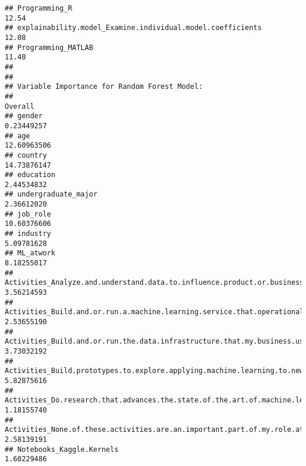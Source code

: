\documentclass[
]{article}
\begin{document}
\begin{verbatim}
## Programming_R                                                                                                                 12.54
## explainability.model_Examine.individual.model.coefficients                                                                    12.08
## Programming_MATLAB                                                                                                            11.40
## 
## 
## Variable Importance for Random Forest Model:
##                                                                                                                                 Overall
## gender                                                                                                                       0.23449257
## age                                                                                                                         12.60963506
## country                                                                                                                     14.73876147
## education                                                                                                                    2.44534832
## undergraduate_major                                                                                                          2.36612020
## job_role                                                                                                                    10.60376606
## industry                                                                                                                     5.09781628
## ML_atwork                                                                                                                    8.18255017
## Activities_Analyze.and.understand.data.to.influence.product.or.business.decisions                                            3.56214593
## Activities_Build.and.or.run.a.machine.learning.service.that.operationally.improves.my.product.or.workflows                   2.53655190
## Activities_Build.and.or.run.the.data.infrastructure.that.my.business.uses.for.storing..analyzing..and.operationalizing.data  3.73032192
## Activities_Build.prototypes.to.explore.applying.machine.learning.to.new.areas                                                5.82875616
## Activities_Do.research.that.advances.the.state.of.the.art.of.machine.learning                                                1.18155740
## Activities_None.of.these.activities.are.an.important.part.of.my.role.at.work                                                 2.58139191
## Notebooks_Kaggle.Kernels                                                                                                     1.60229486

\end{verbatim}
\end{document}
